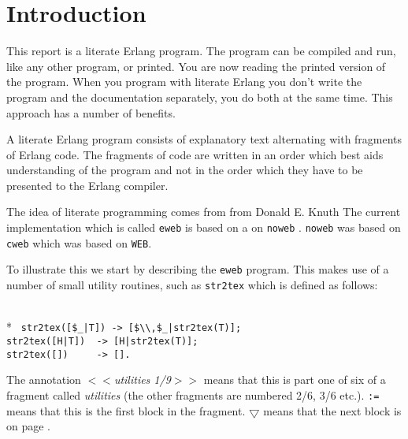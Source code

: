 \pagebreak

\section*{Introduction}

  This  report   is a literate Erlang  program.    The  program can be
compiled and  run,  like any other  program, or  printed.  You are now
reading the  printed version of   the program.  When you program  with
literate   Erlang you don't write    the program and the documentation
separately, you do both at the same time.   This approach has a number
of benefits.

  A literate Erlang program consists  of explanatory text  alternating
with fragments  of Erlang code.  The  fragments of code are written in
an order which best aids understanding  of the program  and not in the
order which they have to be presented to the Erlang compiler.

  The idea  of literate programming comes  from  from Donald E.  Knuth
The current  implementation which is called \verb+eweb+  is based on a
on \verb+noweb+  \cite{noweb}.  \verb+noweb+ was based  on \verb+cweb+
\cite{knuth} which was based on \verb+WEB+.

  To illustrate this we start  by describing the \verb+eweb+  program.
This   makes use of   a number   of small  utility  routines, such  as
\verb+str2tex+ which is defined as follows:

\begin{flushleft}
\label{utilities_start}
\\*
\tt
\noindent{}%
\verb&str2tex([$_|T]) -> [$\\,$_|str2tex(T)];&\\
\noindent{}%
\verb&str2tex([H|T])  -> [H|str2tex(T)];&\\
\noindent{}%
\verb&str2tex([])     -> [].&\\
\end{flushleft}

  The annotation {\sl $<<$utilities  1/9$>>$} means that this  is part
one of six of a fragment called {\sl utilities\/} (the other fragments
are numbered 2/6,  3/6 etc.). \verb+:=+ means that  this is the  first
block   in the fragment.  $\bigtriangledown$   \pageref{utilities_2_8}
means that the next block is on page \pageref{utilities_2_8}.

